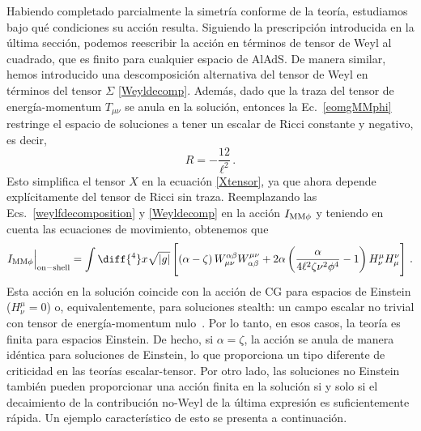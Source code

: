\documentclass[../Main.tex]{subfiles}
\begin{document}
Habiendo completado parcialmente la simetría conforme de la teoría, estudiamos bajo qué condiciones su acción resulta. Siguiendo la prescripción introducida en la última sección, podemos reescribir la acción en términos de tensor de Weyl al cuadrado, que es finito para cualquier espacio de AlAdS. De manera similar, hemos introducido una descomposición alternativa del tensor de Weyl en términos del tensor $\Sigma$ \eqref{Weyldecomp}.
Además, dado que la traza del tensor de energía-momentum $T_{\mu\nu}$ se anula en la solución, entonces la Ec.~\eqref{eomgMMphi} restringe el espacio de soluciones a tener un escalar de Ricci constante y negativo, es decir,
\begin{equation}
    R = -\frac{12}{\ell^2}\,.
\end{equation}
Esto simplifica el tensor $X$ en la ecuación \eqref{Xtensor}, ya que ahora depende explícitamente del tensor de Ricci sin traza. Reemplazando las Ecs.~\eqref{weylfdecomposition} y \eqref{Weyldecomp} en la acción $I_{\rm MM\phi}$ y teniendo en cuenta las ecuaciones de movimiento, obtenemos que
\begin{equation}
I_{\rm MM\phi}\Big|_{\rm on-shell} = \int\diff{^4}x\sqrt{|g|} \left[\left(\alpha -\zeta\right) W^{\alpha \beta}_{\mu \nu} W^{\mu \nu}_{\alpha \beta} + 2 \alpha \left( \frac{\alpha}{4 \ell^{2} \zeta \nu^{2} \phi^{4}}-1\right) H^{\mu}_{\nu} H^{\nu}_{\mu}\right] \,. \label{IMMphios}
\end{equation}
Esta acción en la solución coincide con la acción de CG para espacios de Einstein ($H^{\mu}_{\nu} = 0$) o, equivalentemente, para soluciones stealth: un campo escalar no trivial con tensor de energía-momentum nulo~\cite{Ayon-Beato:2004nzi,Ayon-Beato:2005yoq,Hassaine:2006gz,Ayon-Beato:2013bsa}. Por lo tanto, en esos casos, la teoría es finita para espacios Einstein. De hecho, si $\alpha=\zeta$, la acción se anula de manera idéntica para soluciones de Einstein, lo que proporciona un tipo diferente de criticidad en las teorías escalar-tensor. Por otro lado, las soluciones no Einstein también pueden proporcionar una acción finita en la solución si y solo si el decaimiento de la contribución no-Weyl de la última expresión es suficientemente rápida. Un ejemplo característico de esto se presenta a continuación. 
\end{document}

